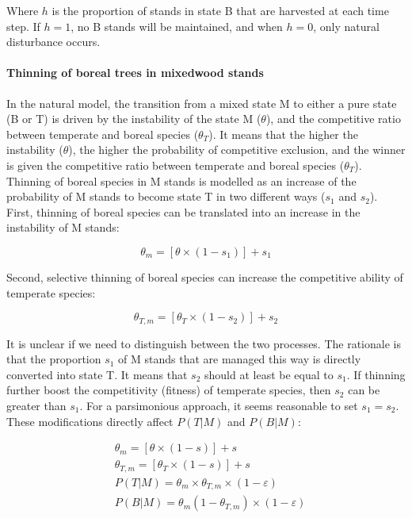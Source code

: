 \documentclass[12pt]{article}
\begin{document}
Where \(h\) is the proportion of stands in state B that are harvested at
each time step. If \(h=1\), no B stands will be maintained, and when
\(h=0\), only natural disturbance occurs.

\hypertarget{thinning-of-boreal-trees-in-mixedwood-stands}{%
\paragraph{Thinning of boreal trees in mixedwood
stands}\label{thinning-of-boreal-trees-in-mixedwood-stands}}

In the natural model, the transition from a mixed state M to either a
pure state (B or T) is driven by the instability of the state M
(\(\theta\)), and the competitive ratio between temperate and boreal
species (\(\theta_T\)). It means that the higher the instability
(\(\theta\)), the higher the probability of competitive exclusion, and
the winner is given the competitive ratio between temperate and boreal
species (\(\theta_T\)). Thinning of boreal species in M stands is
modelled as an increase of the probability of M stands to become state T
in two different ways (\(s_1\) and \(s_2\)). First, thinning of boreal
species can be translated into an increase in the instability of M
stands:

\begin{equation}
  \theta_{m} = [\theta \times (1 - s_1)] + s_1
\label{eq:thinningEq}\end{equation}

Second, selective thinning of boreal species can increase the
competitive ability of temperate species:

\begin{equation}
\theta_{T, m} = [\theta_{T} \times (1 - s_2)] + s_2
\label{eq:thinningEq2}\end{equation}

It is unclear if we need to distinguish between the two processes. The
rationale is that the proportion \(s_1\) of M stands that are managed
this way is directly converted into state T. It means that \(s_2\)
should at least be equal to \(s_1\). If thinning further boost the
competitivity (fitness) of temperate species, then \(s_2\) can be
greater than \(s_1\). For a parsimonious approach, it seems reasonable
to set \(s_1=s_2\). These modifications directly affect \(P(T|M)\) and
\(P(B|M)\):

\begin{equation}
\begin{split}
&\theta_{m} = [\theta \times (1 - s)] + s \\[2pt]
&\theta_{T, m} = [\theta_{T} \times (1 - s)] + s \\[2pt]
&P(T|M) = \theta_m \times \theta_{T,m} \times (1 - \varepsilon) \\[2pt]
&P(B|M) = \theta_m (1 - \theta_{T,m}) \times (1 - \varepsilon)
\end{split}
\label{eq:thinningEq3}\end{equation}
\end{document}

